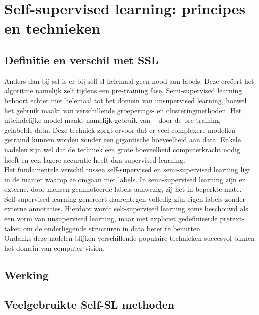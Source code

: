 \section{Self-supervised learning: principes en technieken}

\subsection{Definitie en verschil met SSL}

Anders dan bij \gls{ssl} is er bij \gls{self-sl} helemaal geen nood aan labels. Deze creëert het algoritme namelijk zelf tijdens een pre-training fase. Semi-supervised learning behoort echter niet helemaal tot het domein van unsupervised learning, hoewel het gebruik maakt van verschillende groeperings- en clusteringmethoden. Het uiteindelijke model maakt namelijk gebruik van -- door de pre-training -- gelabelde data. Deze techniek zorgt ervoor dat er veel complexere modellen getraind kunnen worden zonder een gigantische hoeveelheid aan data. Enkele nadelen zijn wel dat de techniek een grote hoeveelheid computerkracht nodig heeft en een lagere accuratie heeft dan supervised learning. \autocite{Gui_2024} \\

Het fundamentele verschil tussen self-supervised en semi-supervised learning ligt in de manier waarop ze omgaan met labels. In semi-supervised learning zijn er externe, door mensen geannoteerde labels aanwezig, zij het in beperkte mate. Self-supervised learning genereert daarentegen volledig zijn eigen labels zonder externe annotaties. Hierdoor wordt self-supervised learning soms beschouwd als een vorm van unsupervised learning, maar met expliciet gedefinieerde pretext-taken om de onderliggende structuren in data beter te benutten. \\

Ondanks deze nadelen blijken verschillende populaire technieken succesvol binnen het domein van computer vision.

\subsection{Werking}

\lipsum[1]

\subsection{Veelgebruikte Self-SL methoden}

\lipsum[1]

